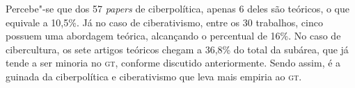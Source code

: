 Percebe"-se que dos 57 \textit{papers} de ciberpolítica, apenas
6 deles são teóricos, o que equivale a 10,5\%. Já no caso de
ciberativismo, entre os 30 trabalhos, cinco possuem uma abordagem
teórica, alcançando o percentual de 16\%. No caso de cibercultura, os
sete artigos teóricos chegam a 36,8\% do total da subárea, que já tende
a ser minoria no \textsc{gt}, conforme discutido anteriormente. Sendo assim, é a
guinada da ciberpolítica e ciberativismo que leva mais empiria ao \textsc{gt}.

